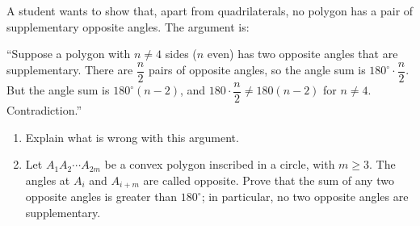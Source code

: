 A student wants to show that, apart from quadrilaterals, no polygon has a pair of supplementary opposite angles. The argument is:

``Suppose a polygon with $n\ne4$ sides ($n$ even) has two opposite angles that are supplementary. There are $\dfrac n2$ pairs of opposite angles, so the angle sum is $180^\circ\cdot\dfrac n2$. But the angle sum is $180^\circ(n-2)$, and $180\cdot\dfrac n2\ne180(n-2)$ for $n\ne4$. Contradiction.''
\begin{enumerate}
\item[(a)] Explain what is wrong with this argument.
\item[(b)] Let $A_1A_2\cdots A_{2m}$ be a convex polygon inscribed in a circle, with $m\ge3$. The angles at $A_i$ and $A_{i+m}$ are called opposite. Prove that the sum of any two opposite angles is greater than $180^\circ$; in particular, no two opposite angles are supplementary.
\end{enumerate}
